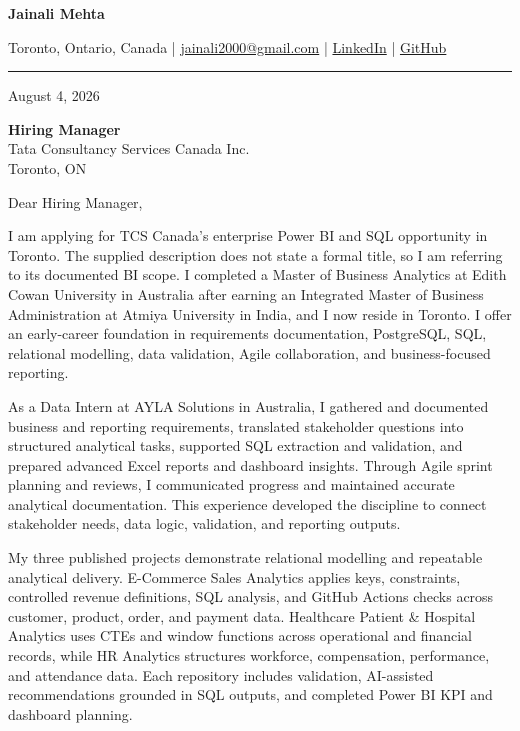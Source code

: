 \documentclass[letterpaper,10pt]{article}
\begin{document}
\begin{center}
  {\fontsize{17}{19}\selectfont\textbf{Jainali Mehta}}\par\vspace{2pt}
  \small Toronto, Ontario, Canada \;|\;
  \href{mailto:jainali2000@gmail.com}{jainali2000@gmail.com} \;|\;
  \href{https://www.linkedin.com/in/jainali-mehta}{LinkedIn} \;|\;
  \href{https://github.com/jainalimehta}{GitHub}
\end{center}
\vspace{-5pt}
\noindent\rule{\textwidth}{0.4pt}

August 4, 2026

\textbf{Hiring Manager}\\
Tata Consultancy Services Canada Inc.\\
Toronto, ON

Dear Hiring Manager,

I am applying for TCS Canada's enterprise Power BI and SQL opportunity in Toronto. The supplied description does not state a formal title, so I am referring to its documented BI scope. I completed a Master of Business Analytics at Edith Cowan University in Australia after earning an Integrated Master of Business Administration at Atmiya University in India, and I now reside in Toronto. I offer an early-career foundation in requirements documentation, PostgreSQL, SQL, relational modelling, data validation, Agile collaboration, and business-focused reporting.

As a Data Intern at AYLA Solutions in Australia, I gathered and documented business and reporting requirements, translated stakeholder questions into structured analytical tasks, supported SQL extraction and validation, and prepared advanced Excel reports and dashboard insights. Through Agile sprint planning and reviews, I communicated progress and maintained accurate analytical documentation. This experience developed the discipline to connect stakeholder needs, data logic, validation, and reporting outputs.

My three published projects demonstrate relational modelling and repeatable analytical delivery. E-Commerce Sales Analytics applies keys, constraints, controlled revenue definitions, SQL analysis, and GitHub Actions checks across customer, product, order, and payment data. Healthcare Patient \& Hospital Analytics uses CTEs and window functions across operational and financial records, while HR Analytics structures workforce, compensation, performance, and attendance data. Each repository includes validation, AI-assisted recommendations grounded in SQL outputs, and completed Power BI KPI and dashboard planning.
\end{document}
